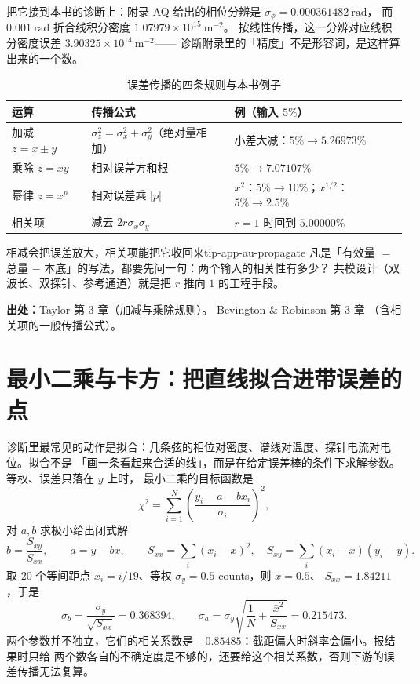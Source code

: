 把它接到本书的诊断上：附录 AQ 给出的相位分辨是 $\sigma_\phi=0.000361482\ \mathrm{rad}$，
而 $0.001\ \mathrm{rad}$ 折合线积分密度 $1.07979\times10^{15}\ \mathrm{m^{-2}}$。
按线性传播，这一分辨对应线积分密度误差 $3.90325\times10^{14}\ \mathrm{m^{-2}}$——
诊断附录里的「精度」不是形容词，是这样算出来的一个数。

\begin{table}[htbp]
\centering
\small
\caption{误差传播的四条规则与本书例子}
\label{tab:app-au-propagate}
\begin{tabular}{p{4.2cm}p{5.2cm}p{5.4cm}}
\hline
运算 & 传播公式 & 例（输入 $5\%$） \\
\hline
加减 $z=x\pm y$ & $\sigma_z^2=\sigma_x^2+\sigma_y^2$（绝对量相加） & 小差大减：$5\%\to5.26973\%$ \\
乘除 $z=xy$ & 相对误差方和根 & $5\%\to7.07107\%$ \\
幂律 $z=x^p$ & 相对误差乘 $\left|p\right|$ & $x^2$：$5\%\to10\%$；$x^{1/2}$：$5\%\to2.5\%$ \\
相关项 & 减去 $2r\sigma_x\sigma_y$ & $r=1$ 时回到 $5.00000\%$ \\
\hline
\end{tabular}
\end{table}

\begin{tip}{相减会把误差放大，相关项能把它收回来}{tip-app-au-propagate}
凡是「有效量 $=$ 总量 $-$ 本底」的写法，都要先问一句：两个输入的相关性有多少？
共模设计（双波长、双探针、参考通道）就是把 $r$ 推向 $1$ 的工程手段。
\end{tip}

{\small

\textbf{出处：}Taylor 第 3 章（加减与乘除规则）。
Bevington \& Robinson 第 3 章
（含相关项的一般传播公式）。
}

\section{最小二乘与卡方：把直线拟合进带误差的点}
\label{sec:app-au-fit}

诊断里最常见的动作是拟合：几条弦的相位对密度、谱线对温度、探针电流对电位。拟合不是
「画一条看起来合适的线」，而是在给定误差棒的条件下求解参数。等权、误差只落在 $y$ 上时，
最小二乘的目标函数是
\begin{equation}
\chi^2=\sum_{i=1}^{N}\left(\frac{y_i-a-bx_i}{\sigma_i}\right)^2 ,
\label{eq:app-au-chi2}
\end{equation}
对 $a,b$ 求极小给出闭式解
\begin{equation}
b=\frac{S_{xy}}{S_{xx}},\qquad a=\bar y-b\bar x ,\qquad
S_{xx}=\sum_i (x_i-\bar x)^2,\quad S_{xy}=\sum_i (x_i-\bar x)(y_i-\bar y).
\label{eq:app-au-lsq}
\end{equation}
取 20 个等间距点 $x_i=i/19$、等权 $\sigma_y=0.5$ counts，则 $\bar x=0.5$、
$S_{xx}=1.84211$，于是
\begin{equation}
\sigma_b=\frac{\sigma_y}{\sqrt{S_{xx}}}=0.368394,\qquad
\sigma_a=\sigma_y\sqrt{\frac{1}{N}+\frac{\bar x^2}{S_{xx}}}=0.215473 .
\label{eq:app-au-cov}
\end{equation}
两个参数并不独立，它们的相关系数是 $-0.85485$：截距偏大时斜率会偏小。报结果时只给
两个数各自的不确定度是不够的，还要给这个相关系数，否则下游的误差传播无法复算。

